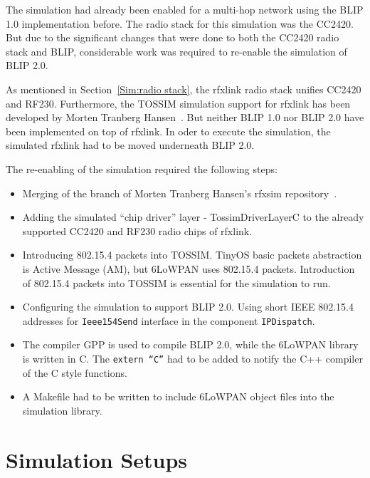 The simulation had already been enabled for a multi-hop network using the BLIP 1.0 implementation before. The radio stack for this simulation was the CC2420. But due to the significant changes that were done to both the CC2420 radio stack and BLIP, considerable work was required to re-enable the simulation of BLIP 2.0. 

As mentioned in Section~\ref{Sim:radio stack}, the rfxlink radio stack unifies CC2420 and RF230. Furthermore, the TOSSIM simulation support for rfxlink has been developed by Morten Tranberg Hansen~\cite{rfxsim}. But neither BLIP 1.0 nor BLIP 2.0 have been implemented on top of rfxlink. In oder to execute the simulation, the simulated rfxlink had to be moved underneath BLIP 2.0. 

The re-enabling of the simulation required the following steps: 
\begin{itemize}
\item Merging of the branch of Morten Tranberg Hansen's rfxsim repository~\cite{rfxsim}. 

\item Adding the simulated ``chip driver'' layer - TossimDriverLayerC to the already supported CC2420 and RF230 radio chips of rfxlink. 

\item Introducing 802.15.4 packets into TOSSIM. TinyOS basic packets abstraction is Active Message (AM), but 6LoWPAN uses 802.15.4 packets. Introduction of 802.15.4 packets into TOSSIM is essential for the simulation to run.

\item Configuring the simulation to support BLIP 2.0. Using short IEEE 802.15.4 addresses for \texttt{Ieee154Send} interface in the component \texttt{IPDispatch}. 

\item The compiler GPP is used to compile BLIP 2.0, while the 6LoWPAN library is written in C. The \texttt{extern ``C''} had to be added to notify the C++ compiler of the C style functions.

\item A Makefile had to be written to include 6LoWPAN object files into the simulation library.
\end{itemize}

\section{Simulation Setups}
\label{Sim:Setup}
